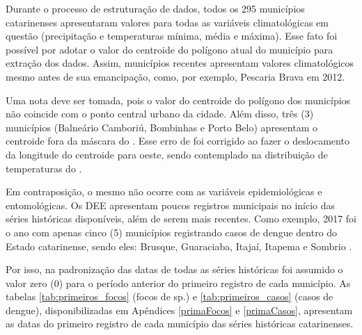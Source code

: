 \indent Durante o processo de estruturação de dados, todos os 295 municípios catarinenses apresentaram valores para todas as variáveis climatológicas em questão (precipitação e temperaturas mínima, média e máxima). Esse fato foi possível por adotar o valor do centroide do polígono atual do município para extração dos dados. Assim, municípios recentes apresentam valores climatológicos mesmo antes de sua emancipação, como, por exemplo, Pescaria Brava em 2012.

\indent Uma nota deve ser tomada, pois o valor do centroide do polígono dos municípios  não coincide com o ponto central urbano da cidade. Além disso, três (3) municípios (Balneário Camboriú, Bombinhas e Porto Belo) apresentam o centroide fora da máscara do . Esse erro de  foi corrigido ao fazer o deslocamento da longitude do centroide para oeste, sendo contemplado na distribuição de temperaturas do .

\indent Em contraposição, o mesmo não ocorre com as variáveis epidemiológicas e entomológicas. Os \acrshort{DEE} apresentam poucos registros municipais no início das séries históricas disponíveis, além de serem mais recentes. Como exemplo, 2017 foi o ano com apenas cinco (5) municípios registrando casos de dengue dentro do Estado catarinense, sendo eles: Brusque, Guaraciaba, Itajaí, Itapema e Sombrio \cite{OTPCampo}.

\indent Por isso, na padronização das datas de todas as séries históricas foi assumido o valor zero (0) para o período anterior do primeiro registro de cada município. As tabelas \ref{tab:primeiros_focos} (focos de  sp.) e \ref{tab:primeiros_casos} (casos de dengue), disponibilizadas em Apêndices \ref{primaFocos} e \ref{primaCasos}, apresentam as datas do primeiro registro de cada município das séries históricas catarinenses.





